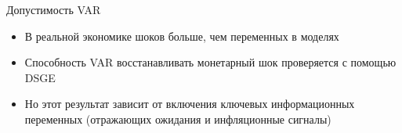 \begin{frame}{Допустимость VAR}
\small
\begin{itemize}
\setlength\itemsep{0.5em}
\item В реальной экономике шоков больше, чем переменных в моделях
\item Способность VAR восстанавливать монетарный шок проверяется с помощью DSGE
\item Но этот результат зависит от включения ключевых информационных переменных (отражающих ожидания и инфляционные сигналы)
\end{itemize}
\end{frame}
